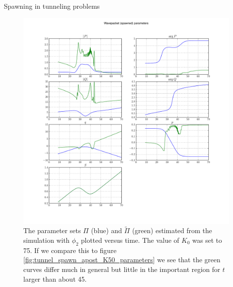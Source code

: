 \begin{chapter}{Spawning in tunneling problems}
\begin{figure}[h!]
  \centering
  \includegraphics[width=\the\linewidth]{./figures/eckart_spawn_apost_phi2_K75/wavepacket_parameters_abs_ang_spawned.pdf}
  \caption[The parameter sets $\Pi$ and $\tilde{\Pi}$]{The parameter sets $\Pi$
  (blue) and $\tilde{\Pi}$ (green) estimated from the simulation with $\phi_2$
  plotted versus time. The value of $K_0$ was set to 75.
  If we compare this to figure \ref{fig:tunnel_spawn_apost_K50_parameters} we see
  that the green curves differ much in general but little in the important region
  for $t$ larger than about 45.}
\end{figure}


\end{chapter}
